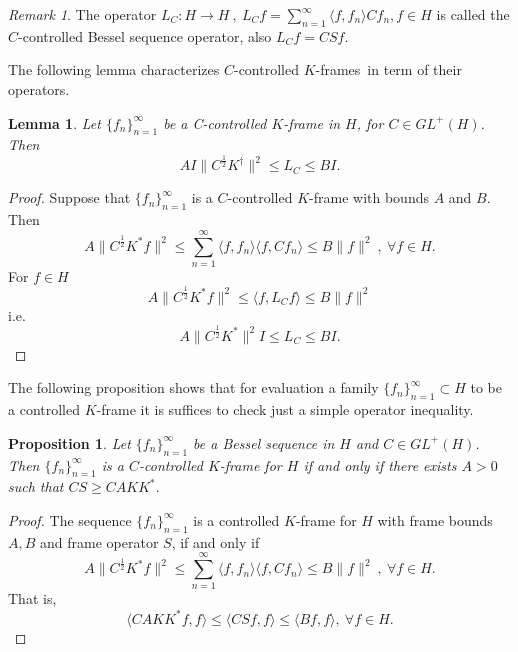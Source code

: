 \documentclass[11pt]{amsart}
\newtheorem{lem}[thm]{Lemma}
\newtheorem{prop}[thm]{Proposition}
\theoremstyle{definition}
\theoremstyle{remark}
\newtheorem{rem}[thm]{Remark}
\numberwithin{equation}{section}
\begin{document}
\begin{rem}
The operator $L_C:H\to H\ ,~L_Cf=\sum_{n=1}^{\infty}\langle f,f_n\rangle Cf_n, f\in H$ is called the $C$-controlled Bessel sequence operator, also $L_Cf=CSf$.
\end{rem}
The following lemma characterizes  $C$-controlled {$K$-frames}\ in term of their operators.
\begin{lem}\label{lm:25}
Let $\{f_n\}_{n=1}^\infty$ be a C-controlled $K$-frame in $H$, for $C\in GL^+(H)$. Then
\[AI\|C^{\frac{1}{2}}K^\dagger\|^2\le L_C\le BI.\]
\end{lem}
\begin{proof}
Suppose that  $\{f_n\}_{n=1}^\infty$ is a $C$-controlled $K$-frame with bounds $A$ and $B$. Then
\[A\|C^{\frac{1}{2}}K^*f\|^2\le\sum_{n=1}^{\infty}\langle f,f_n\rangle\langle f,Cf_n\rangle\le B\|f\|^2\ ,~\forall f\in H.\]
For $f \in H$
\[A\|C^{\frac{1}{2}}K^*f\|^2\le\langle f,L_Cf\rangle\le B\|f\|^2\]
i.e.
\[A\|C^{\frac{1}{2}}K^*\|^2I\le L_C\le BI.\]
\end{proof}
The following proposition shows that for evaluation a family $\{f_n\}_{n=1}^\infty\subset H$ to be a controlled $K$-frame it is suffices to check just a simple operator inequality.
\begin{prop}
Let $\{f_n\}_{n=1}^\infty$ be a Bessel sequence in $H$ and $C\in GL^+(H)$. Then  $\{f_n\}_{n=1}^\infty$ is a $C$-controlled $K$-frame for $H$ if and only if there exists $A>0$ such that $CS\ge CAKK^*.$
\end{prop}
\begin{proof} The sequence
$\{f_n\}_{n=1}^\infty$ is a controlled $K$-frame for $H$ with frame bounds $A,B$ and frame operator $S$, if and only if
\[A\|C^{\frac{1}{2}}K^*f\|^2\le\sum_{n=1}^{\infty}\langle f,f_n\rangle\langle f,Cf_n\rangle\le B\|f\|^2\ ,~\forall f\in H.\]
That is,
\[\langle CAKK^*f,f\rangle\le\langle CSf,f\rangle\le\langle Bf,f\rangle, ~\forall f\in H.\]

\end{proof}
\end{document}
